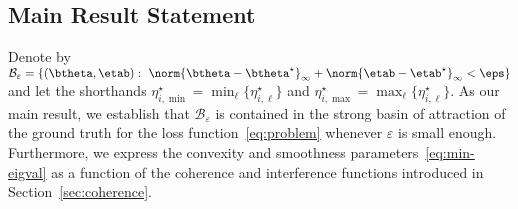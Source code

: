 \documentclass[conference,english,final,svgnames]{IEEEtran}
\begin{document}
\subsection{Main Result Statement}
Denote by $\mathcal{B}_\varepsilon = \{(\btheta, \etab): \ \norm{\btheta - \btheta^{\star}}_{\infty} + \norm{\etab - \etab^{\star}}_{\infty} < \eps\}$ 
and let the shorthands $\eta_{i,\min}^\star = \min_\ell \{\eta_{i,\ell}^\star\}$ and $\eta_{i,\max}^\star = \max_\ell \{\eta_{i,\ell}^\star\}$. As our main result, we establish that $\mathcal{B}_\varepsilon$ is contained in the strong basin of attraction of the ground truth for the loss function~\eqref{eq:problem} whenever $\varepsilon$ is small enough. Furthermore, we express the convexity and smoothness parameters~\eqref{eq:min-eigval} as a function of the coherence and interference functions introduced in Section~\ref{sec:coherence}.
\end{document}
